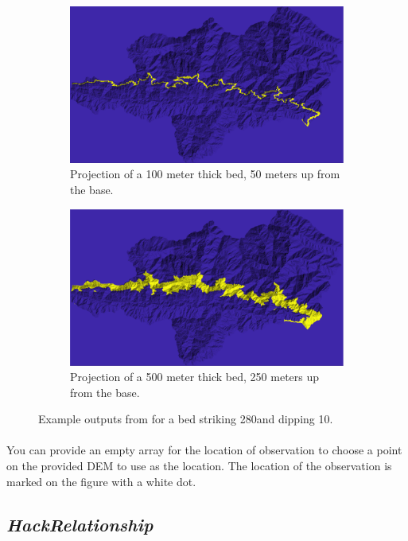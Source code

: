 \begin{figure}[H]
	\centering
	\begin{subfigure}{.5\textwidth}
		\centering
		\includegraphics[width=.8\linewidth]{PNGs/Bed1.png}
		\caption{Projection of a 100 meter thick bed, 50 meters up from the base.}
		\label{fig:BedSub1}
	\end{subfigure}%
	\begin{subfigure}{.5\textwidth}
		\centering
		\includegraphics[width=.8\linewidth]{PNGs/Bed2.png}
		\caption{Projection of a 500 meter thick bed, 250 meters up from the base.}
		\label{fig:BedSub2}
	\end{subfigure}
	\caption{Example outputs from  for a bed striking 280\textdegree and dipping 10\textdegree.}
	\label{fig:Bed}
\end{figure}

\paragraph{}You can provide an empty array for the location of observation to choose a point on the provided DEM to use as the location. The location of the observation is marked on the figure with a white dot.

\subsection{\textit{HackRelationship}}
